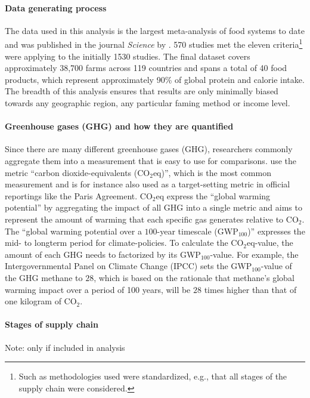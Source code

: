 \documentclass{article}
\begin{document}
\paragraph{Data generating process} \label{dataGen}
The data used in this analysis  is the largest meta-analysis of food systems to date and was published in the journal \textit{Science} by \citet{Poore2018}.
570 studies met the eleven criteria\footnote{Such as  methodologies used were standardized, e.g., that all stages of the supply chain were considered.} \citet{Poore2018}  were applying to the initially  1530 studies.
The final dataset covers approximately 38,700 farms across 119 countries and spans a total of 40 food products, which represent approximately 90\% of global protein and calorie intake. The breadth of this analysis ensures that results are only minimally biased towards any geographic region,  any particular faming method or income level.
\paragraph*{Greenhouse gases (GHG) and how they are quantified}
Since there are many different greenhouse gases (GHG), researchers commonly aggregate them into a measurement that is easy to use for comparisons. 
\citet{Poore2018} use the metric 
``carbon dioxide-equivalents (CO$_{2}$eq)'', which is the most common measurement and is for instance  also used as a target-setting metric in official reportings like the Paris Agreement. CO$_{2}$eq express the ``global warming potential'' by aggregating the impact of all GHG into a single metric  and  aims to represent the amount of warming that each specific gas generates relative to CO$_2$. The ``global warming potential over a $100$-year timescale (GWP$_{100}$)'' expresses the mid- to longterm period for climate-policies. To calculate the CO$_{2}$eq-value, the amount of each GHG needs to factorized by its GWP$_{100}$-value. For example, the Intergovernmental Panel on Climate Change (IPCC) sets the GWP$_{100}$-value of the GHG  methane to $28$, which is based on the rationale that methane's global warming impact over a period of 100 years, will be $28$ times higher than that of one kilogram of CO$_2$.
\paragraph{Stages of supply chain}
Note: only if included in analysis
\end{document}
